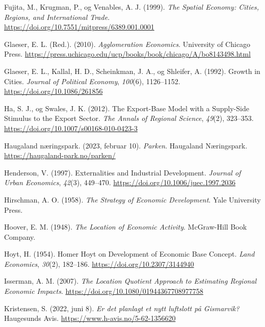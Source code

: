 \documentclass[
]{article}
\newlength{\cslhangindent}
\newlength{\cslentryspacingunit} %
\newenvironment{CSLReferences}[2] %
 {%
  \setlength{\parindent}{0pt}
  \ifodd #1
  \let\oldpar\par
  \def\par{\hangindent=\cslhangindent\oldpar}
  \fi
  \setlength{\parskip}{#2\cslentryspacingunit}
 }%
 {}
\begin{document}
\begin{CSLReferences}{1}{0}
\leavevmode{}%
Fujita, M., Krugman, P., og Venables, A. J. (1999). \emph{The {Spatial
Economy}: {Cities}, {Regions}, and {International Trade}}.
\url{https://doi.org/10.7551/mitpress/6389.001.0001}

\leavevmode{}%
Glaeser, E. L. (Red.). (2010). \emph{Agglomeration {Economics}}.
{University of Chicago Press}.
\url{https://press.uchicago.edu/ucp/books/book/chicago/A/bo8143498.html}

\leavevmode{}%
Glaeser, E. L., Kallal, H. D., Scheinkman, J. A., og Shleifer, A.
(1992). Growth in {Cities}. \emph{Journal of Political Economy},
\emph{100}(6), 1126--1152. \url{https://doi.org/10.1086/261856}

\leavevmode{}%
Ha, S. J., og Swales, J. K. (2012). The Export-Base Model with a
Supply-Side Stimulus to the Export Sector. \emph{The Annals of Regional
Science}, \emph{49}(2), 323--353.
\url{https://doi.org/10.1007/s00168-010-0423-3}

\leavevmode{}%
Haugaland næringspark. (2023, februar 10). \emph{Parken}. {Haugaland
Næringspark}. \url{https://haugaland-park.no/parken/}

\leavevmode{}%
Henderson, V. (1997). Externalities and {Industrial Development}.
\emph{Journal of Urban Economics}, \emph{42}(3), 449--470.
\url{https://doi.org/10.1006/juec.1997.2036}

\leavevmode{}%
Hirschman, A. O. (1958). \emph{The {Strategy} of {Economic
Development}}. {Yale University Press}.

\leavevmode{}%
Hoover, E. M. (1948). \emph{The Location of Economic Activity}.
{McGraw-Hill Book Company}.

\leavevmode{}%
Hoyt, H. (1954). Homer {Hoyt} on {Development} of {Economic Base
Concept}. \emph{Land Economics}, \emph{30}(2), 182--186.
\url{https://doi.org/10.2307/3144940}

\leavevmode{}%
Isserman, A. M. (2007). \emph{The {Location Quotient Approach} to
{Estimating Regional Economic Impacts}}.
\url{https://doi.org/10.1080/01944367708977758}

\leavevmode{}%
Kristensen, S. (2022, juni 8). \emph{Er det planlagt et nytt luftslott
på Gismarvik?} {Haugesunds Avis}.
\url{https://www.h-avis.no/5-62-1356620}


\end{CSLReferences}
\end{document}
